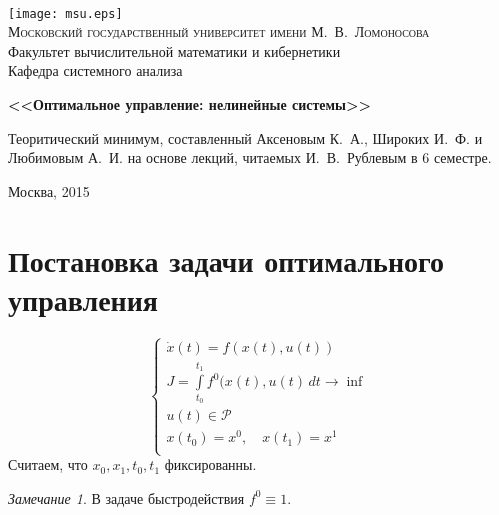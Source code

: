 \documentclass[oneside, final, 14pt, draft]{article}
\theoremstyle{definition}
\theoremstyle{definition}
\theoremstyle{remark}
\newtheorem{rmk}{Замечание}[section]
\theoremstyle{theorem}
\begin{document}
\begin{titlepage}

\thispagestyle{empty}

\begin{center}
\ \vspace{-3cm}

\texttt{[image: msu.eps]}\\
{\scshape Московский государственный университет имени М.~В.~Ломоносова}\\
Факультет вычислительной математики и кибернетики\\
Кафедра системного анализа

\vfill



\vspace{1cm}

{\Huge\bfseries <<Оптимальное управление: нелинейные системы>>}

\end{center}

\vspace{1cm}


\vfill
\begin{center}
Теоритический минимум, составленный Аксеновым К.~А., Широких И.~Ф. и Любимовым А.~И. на основе лекций, читаемых И.~В.~Рублевым в 6 семестре.
\end{center}
\begin{center}
Москва, 2015
\end{center}

\end{titlepage}
\tableofcontents
\newpage
\section{Постановка задачи оптимального управления}

\begin{equation*}
\begin{cases}
\dot{x}(t) = f(x(t), u(t))\\
J = \int\limits_{t_0}^{t_1} f^0(x(t),u(t)\,dt \longrightarrow \inf\\
u(t) \in \mathcal{P}\\
x(t_0) = x^0,\quad x(t_1) = x^1\\
\end{cases}
\end{equation*}
Считаем, что $x_0,x_1,t_0,t_1$ фиксированны.
\begin{rmk}
В задаче быстродействия $f^0\equiv1$.
\end{rmk}
\end{document}
